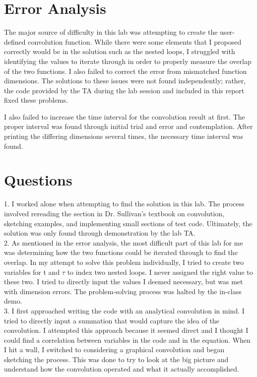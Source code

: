 \documentclass[12pt]{report}
\begin{document}
\section{Error Analysis}

The major source of difficulty in this lab was attempting to create the user-defined convolution function. While there were some elements that I proposed correctly would be in the solution such as the nested loops, I struggled with identifying the values to iterate through in order to properly measure the overlap of the two functions. I also failed to correct the error from mismatched function dimensions. The solutions to these issues were not found independently; rather, the code provided by the TA during the lab session and included in this report fixed these problems. 

I also failed to increase the time interval for the convolution result at first. The proper interval was found through initial trial and error and contemplation. After printing the differing dimensions several times, the necessary time interval was found.
		
\section{Questions}
	
1. I worked alone when attempting to find the solution in this lab. The process involved rereading the section in Dr. Sullivan's textbook on convolution, sketching examples, and implementing small sections of test code. Ultimately, the solution was only found through demonstration by the lab TA. \\
	
2. As mentioned in the error analysis, the most difficult part of this lab for me was determining how the two functions could be iterated through to find the overlap. In my attempt to solve this problem individually, I tried to create two variables for t and $\tau$ to index two nested loops. I never assigned the right value to these two. I tried to directly input the values I deemed necessary, but was met with dimension errors. The problem-solving process was halted by the in-class demo. \\
	
3. I first approached writing the code with an analytical convolution in mind. I tried to directly input a summation that would capture the idea of the convolution. I attempted this approach because it seemed direct and I thought I could find a correlation between variables in the code and in the equation. When I hit a wall, I switched to considering a graphical convolution and began sketching the process. This was done to try to look at the big picture and understand how the convolution operated and what it actually accomplished. \\
	
\end{document}
